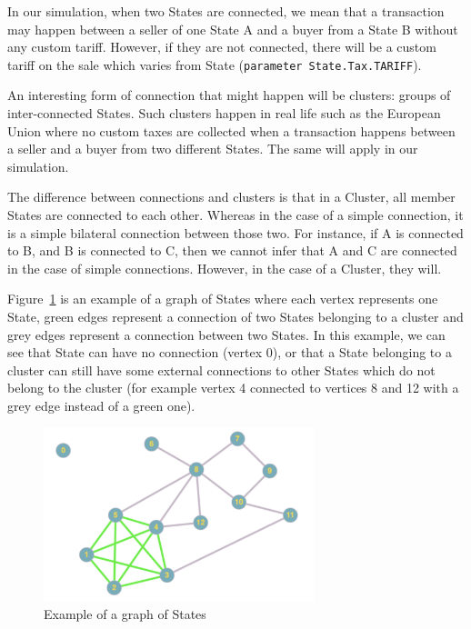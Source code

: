     In our simulation, when two States are connected, we mean that a transaction may happen between a seller of one State A and a buyer from a State B without any custom tariff. However, if they are not connected, there will be a custom tariff on the sale which varies from State (\texttt{parameter State.Tax.TARIFF}). 

    An interesting form of connection that might happen will be clusters: groups of inter-connected States. Such clusters happen in real life such as the European Union where no custom taxes are collected when a transaction happens between a seller and a buyer from two different States. The same will apply in our simulation. 

    The difference between connections and clusters is that in a Cluster, all member States are connected to each other. Whereas in the case of a simple connection, it is a simple bilateral connection between those two. For instance, if A is connected to B, and B is connected to C, then we cannot infer that A and C are connected in the case of simple connections. However, in the case of a Cluster, they will.

    Figure~\ref{fig:connected_states} is an example of a graph of States where each vertex represents one State, green edges represent a connection of two States belonging to a cluster and grey edges represent a connection between two States. In this example, we can see that State can have no connection (vertex 0), or that a State belonging to a cluster can still have some external connections to other States which do not belong to the cluster (for example vertex 4 connected to vertices 8 and 12 with a grey edge instead of a green one).

    \begin{figure}[H]
    \centering
    \includegraphics[width=0.7\textwidth]{img/connected_states.jpg}
    \caption{Example of a graph of States}
    \label{fig:connected_states}
    \end{figure}

